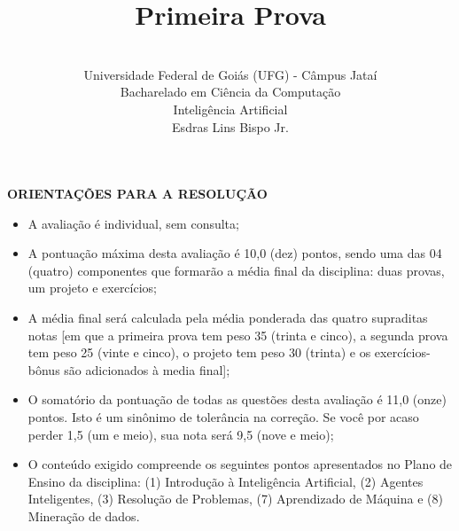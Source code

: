 \documentclass[12pt,a4paper,oneside]{article}
\author{\\Universidade Federal de Goiás (UFG) - Câmpus Jataí\\Bacharelado em Ciência da Computação \\Inteligência Artificial \\Esdras Lins Bispo Jr.}
\title{\sc \huge Primeira Prova}
\begin{document}
\maketitle

{\bf ORIENTAÇÕES PARA A RESOLUÇÃO}

\begin{itemize}
	\item A avaliação é individual, sem consulta;
	\item A pontuação máxima desta avaliação é 10,0 (dez) pontos, sendo uma das 04 (quatro) componentes que formarão a média final da disciplina: duas provas, um projeto e exercícios;
	\item A média final será calculada pela média ponderada das quatro supraditas notas [em que a primeira prova tem peso 35 (trinta e cinco), a segunda prova tem peso 25 (vinte e cinco), o projeto tem peso 30 (trinta) e os exercícios-bônus são adicionados à media final];
	\item O somatório da pontuação de todas as questões desta avaliação é 11,0 (onze) pontos. Isto é um sinônimo de tolerância na correção. Se você por acaso perder 1,5 (um e meio), sua nota será 9,5 (nove e meio);
	\item O conteúdo exigido compreende os seguintes pontos apresentados no Plano de Ensino da disciplina: (1) Introdução à Inteligência Artificial, (2) Agentes Inteligentes, (3) Resolução de Problemas, (7) Aprendizado de Máquina e (8) Mineração de dados.
\end{itemize}

\begin{center}
\end{center}

\newpage
\end{document}
